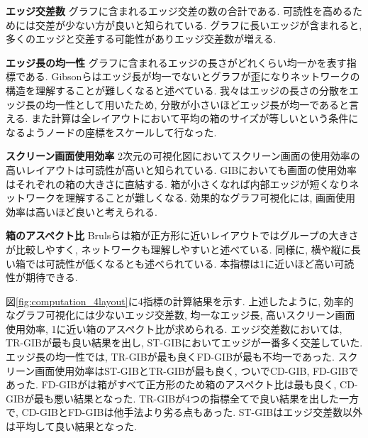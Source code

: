 \documentclass{kuee}
\begin{document}
\begin{description}
  \item{\bf エッジ交差数} グラフに含まれるエッジ交差の数の合計である.
  可読性を高めるためには交差が少ない方が良いと知られている.
  グラフに長いエッジが含まれると, 多くのエッジと交差する可能性がありエッジ交差数が増える.
  \item{\bf エッジ長の均一性} グラフに含まれるエッジの長さがどれくらい均一かを表す指標である.
  Gibsonらはエッジ長が均一でないとグラフが歪になりネットワークの構造を理解することが難しくなると述べている\cite{doi:10.1177/1473871612455749}.
  我々はエッジの長さの分散をエッジ長の均一性として用いたため, 分散が小さいほどエッジ長が均一であると言える.
  また計算は全レイアウトにおいて平均の箱のサイズが等しいという条件になるようノードの座標をスケールして行なった.
  \item{\bf スクリーン画面使用効率} 2次元の可視化図においてスクリーン画面の使用効率の高いレイアウトは可読性が高いと知られている\cite{shneiderman1992tree}.
  GIBにおいても画面の使用効率はそれぞれの箱の大きさに直結する.
  箱が小さくなれば内部エッジが短くなりネットワークを理解することが難しくなる.
  効果的なグラフ可視化には, 画面使用効率は高いほど良いと考えられる.
  \item{\bf 箱のアスペクト比} Brulsらは箱が正方形に近いレイアウトではグループの大きさが比較しやすく, ネットワークも理解しやすいと述べている\cite{bruls2000squarified}.
  同様に, 横や縦に長い箱では可読性が低くなるとも述べられている.
  本指標は1に近いほど高い可読性が期待できる.
\end{description}

図\ref{fig:computation_4layout}に4指標の計算結果を示す.
上述したように, 効率的なグラフ可視化には少ないエッジ交差数, 均一なエッジ長, 高いスクリーン画面使用効率, 1に近い箱のアスペクト比が求められる.
エッジ交差数においては, TR-GIBが最も良い結果を出し, ST-GIBにおいてエッジが一番多く交差していた.
エッジ長の均一性では, TR-GIBが最も良くFD-GIBが最も不均一であった.
スクリーン画面使用効率はST-GIBとTR-GIBが最も良く, ついでCD-GIB, FD-GIBであった.
FD-GIBがは箱がすべて正方形のため箱のアスペクト比は最も良く, CD-GIBが最も悪い結果となった.
TR-GIBが4つの指標全てで良い結果を出した一方で, CD-GIBとFD-GIBは他手法より劣る点もあった.
ST-GIBはエッジ交差数以外は平均して良い結果となった.
\end{document}
